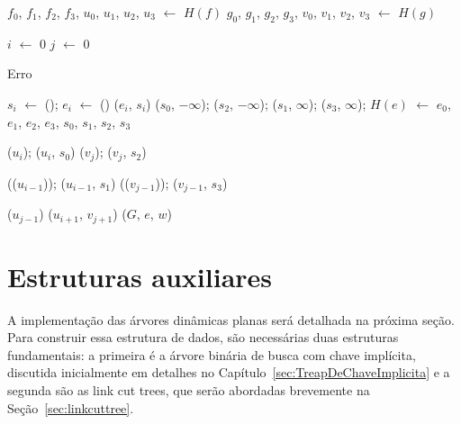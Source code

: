 \begin{algorithm}[htb]
\caption{\MSFaddEdge($G$, $e$, $u$, $f$, $v$, $g$, $w$)}
\label{Algo:MSFaddEdge}
\begin{algorithmic}[1]

\State $f_0$, $f_1$, $f_2$, $f_3$, $u_0$, $u_1$, $u_2$, $u_3$ $\gets$ $H(f)$
\State $g_0$, $g_1$, $g_2$, $g_3$, $v_0$, $v_1$, $v_2$, $v_3$ $\gets$ $H(g)$

 $i$ $\gets$ $0$
\EndIf
{} $j$ $\gets$ $0$
\EndIf

\label{Algo:MSFaddEdge:linhaSe}
\State \Return Erro
\EndIf

\State $s_i$ $\gets$ \LCOMakeNode(); $e_i$ $\gets$ \LCOMakeNode()
\State \linkcutAddEdge($e_i$, $s_i$)
\EndFor
\State \LCOAddCost($s_0$, $-\infty$); \LCOAddCost($s_2$, $-\infty$);
\State \LCOAddCost($s_1$, $\infty$); \LCOAddCost($s_3$, $\infty$);
\State $H(e)$ $\gets$ $e_0$, $e_1$, $e_2$, $e_3$, $s_0$, $s_1$, $s_2$, $s_3$

\State \LCOCycle($u_i$); \LCOMerge($u_i$, $s_0$)\label{Algo:MSFaddEdge:começo}
\State \LCOCycle($v_j$); \LCOMerge($v_j$, $s_2$)


\State \LCOCycle(\treapPredecessor($u_{i-1}$)); \LCOMerge($u_{i-1}$, $s_1$)
\State \LCOCycle(\treapPredecessor($v_{j-1}$)); \LCOMerge($v_{j-1}$, $s_3$)\label{Algo:MSFaddEdge:fim}


\State \LCOSplit($u_{j-1}$)
\Else
\State \LCOMerge($u_{i+1}$, $v_{j+1}$)
\EndIf
\State \MSFupdate($G$, $e$, $w$)
\end{algorithmic}
\end{algorithm}

\section{Estruturas auxiliares}

A implementação das árvores dinâmicas planas será detalhada na próxima seção.
Para construir essa estrutura de dados, são necessárias duas estruturas fundamentais: a primeira é a árvore binária de busca com chave implícita, discutida inicialmente em detalhes no Capítulo~\ref{sec:TreapDeChaveImplicita} e a segunda são as link cut trees, que serão abordadas brevemente na Seção~\ref{sec:linkcuttree}.

